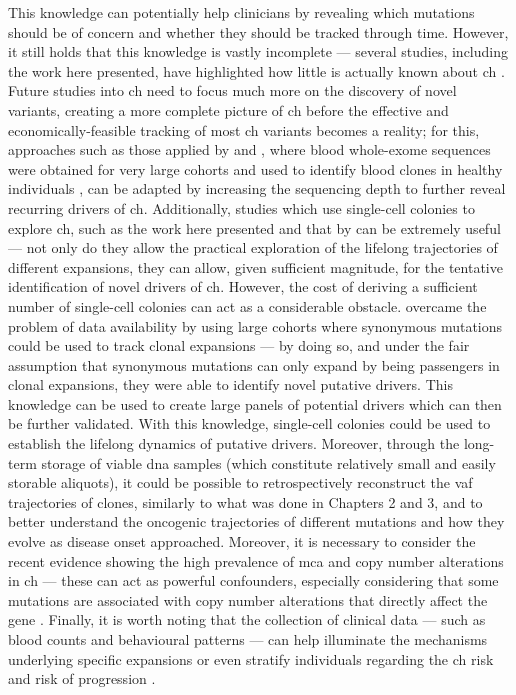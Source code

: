 This knowledge can potentially help clinicians by revealing which mutations should be of concern and whether they should be tracked through time. However, it still holds that this knowledge is vastly incomplete --- several studies, including the work here presented, have highlighted how little is actually known about \ac{ch} \cite{Poon2020-ek,Mitchell2021-zl,Fabre2021-uw}. Future studies into \ac{ch} need to focus much more on the discovery of novel variants, creating a more complete picture of \ac{ch} before the effective and economically-feasible tracking of most \ac{ch} variants becomes a reality; for this, approaches such as those applied by  and , where blood whole-exome sequences were obtained for very large cohorts and used to identify blood clones in healthy individuals \cite{Jaiswal2014-rl,Genovese2014-eu}, can be adapted by increasing the sequencing depth to further reveal recurring drivers of \ac{ch}. Additionally, studies which use single-cell colonies to explore \ac{ch}, such as the work here presented and that by  can be extremely useful --- not only do they allow the practical exploration of the lifelong trajectories of different expansions, they can allow, given sufficient magnitude, for the tentative identification of novel drivers of \ac{ch}. However, the cost of deriving a sufficient number of single-cell colonies can act as a considerable obstacle.  overcame the problem of data availability by using large cohorts where synonymous mutations could be used to track clonal expansions --- by doing so, and under the fair assumption that synonymous mutations can only expand by being passengers in clonal expansions, they were able to identify novel putative drivers. This knowledge can be used to create large panels of potential drivers which can then be further validated. With this knowledge, single-cell colonies could be used to establish the lifelong dynamics of putative drivers. Moreover, through the long-term storage of viable \ac{dna} samples (which constitute relatively small and easily storable aliquots), it could be possible to retrospectively reconstruct the \ac{vaf} trajectories of clones, similarly to what was done in Chapters 2 and 3, and to better understand the oncogenic trajectories of different mutations and how they evolve as disease onset approached. Moreover, it is necessary to consider the recent evidence showing the high prevalence of \ac{mca} and copy number alterations in \ac{ch} --- these can act as powerful confounders, especially considering that some mutations are associated with copy number alterations that directly affect the gene \cite{Gao2021-ph,Saiki2021-sq}. Finally, it is worth noting that the collection of clinical data --- such as blood counts and behavioural patterns --- can help illuminate the mechanisms underlying specific expansions or even stratify individuals regarding the \ac{ch} risk and risk of progression \cite{Dawoud2020-af,Abelson2018-wh}.

